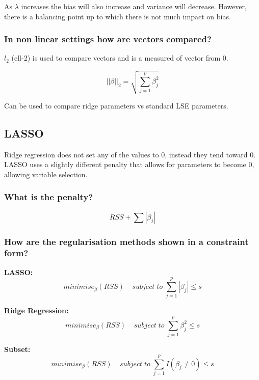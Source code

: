 \documentclass[11pt]{scrartcl} %
\begin{document}
As \(\lambda\) increases the bias will also increase and variance will decrease. However, there
is a balancing point up to which there is not much impact on bias.

\subsubsection{In non linear settings how are vectors compared?}

\(l_2\) (ell-2) is used to compare vectors and is a measured of vector from 0.

\begin{equation}
	||\beta||_2=\sqrt{\sum^p_{j=1}{\beta_j^2}}
\end{equation}

Can be used to compare ridge parameters vs standard LSE parameters.

\subsection{LASSO}

Ridge regression does not set any of the values to 0, instead they tend toward 0. LASSO uses
a slightly different penalty that allows for parameters to become 0, allowing variable selection.

\subsubsection{What is the penalty?}

\begin{equation}
	RSS + \sum{|\beta_j|}
\end{equation}

\subsubsection{How are the regularisation methods shown in a constraint form?}

\textbf{LASSO:}
\begin{equation}
	minimise_{\beta}(RSS)\;\;\;\; subject\; to\; \sum^p_{j=1}{|\beta_j|} \leq s
\end{equation}

\textbf{Ridge Regression:}
\begin{equation}
	minimise_{\beta}(RSS)\;\;\;\; subject\; to\; \sum^p_{j=1}{\beta_j^2} \leq s
\end{equation}

\textbf{Subset:}
\begin{equation}
	minimise_{\beta}(RSS)\;\;\;\; subject\; to\; \sum^p_{j=1}{I(\beta_j\neq 0)} \leq s
\end{equation}
\end{document}

